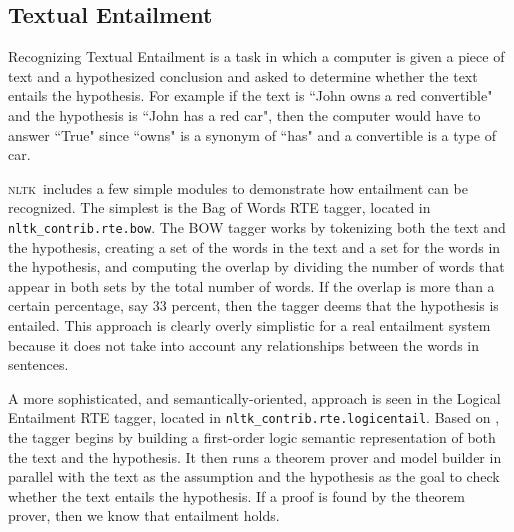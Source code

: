 \documentclass[11pt, a4paper]{article}
\newcommand{\NLTK}{\textsc{nltk}}
\begin{document}


\subsection{Textual Entailment}
Recognizing Textual Entailment is a task in which a computer is given
a piece of text and a hypothesized conclusion and asked to determine
whether the text entails the hypothesis.  For example if the text is
``John owns a red convertible" and the hypothesis is ``John has a red
car", then the computer would have to answer ``True" since ``owns" is
a synonym of ``has" and a convertible is a type of car.

\NLTK\ includes a few simple modules to demonstrate how entailment can
be recognized.  The simplest is the Bag of Words RTE tagger, located
in \texttt{nltk\_contrib.rte.bow}.  The BOW tagger works by
tokenizing both the text and the hypothesis, creating a set of the
words in the text and a set for the words in the hypothesis, and
computing the overlap by dividing the number of words that appear in
both sets by the total number of words.  If the overlap is more than a
certain percentage, say 33 percent, then the tagger deems that the
hypothesis is entailed.  This approach is clearly overly simplistic
for a real entailment system because it does not take into account any
relationships between the words in sentences.

A more sophisticated, and semantically-oriented, approach is seen in
the Logical Entailment RTE tagger, located in
\texttt{nltk\_contrib.rte.logicentail}.  Based on \cite{BosRTE}, the
tagger begins by building a first-order logic semantic representation
of both the text and the hypothesis.  It then runs a theorem prover
and model builder in parallel with the text as the assumption and the
hypothesis as the goal to check whether the text entails the
hypothesis.  If a proof is found by the theorem prover, then we know
that entailment holds.
\end{document}
